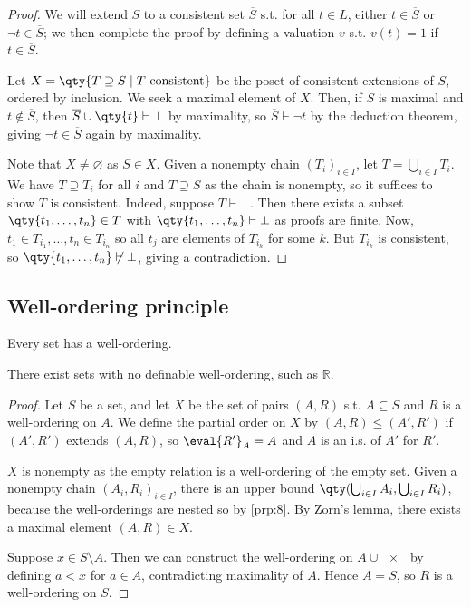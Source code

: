 \begin{proof}
    We will extend $S$ to a consistent set $\overline S$ s.t. for all $t \in L$, either $t \in \overline S$ or $\neg t \in \overline S$; we then complete the proof by defining a valuation $v$ s.t. $v(t) = 1$ if $t \in \overline S$.

    Let $X = \qty{T \supseteq S \mid T \text{ consistent}}$ be the poset of consistent extensions of $S$, ordered by inclusion.
    We seek a maximal element of $X$.
    Then, if $\overline S$ is maximal and $t \not\in \overline S$, then $\overline S \cup \qty{t} \vdash \bot$ by maximality, so $\overline S \vdash \neg t$ by the deduction theorem, giving $\neg t \in \overline S$ again by maximality.

    Note that $X \neq \varnothing$ as $S \in X$.
    Given a nonempty chain $(T_i)_{i \in I}$, let $T = \bigcup_{i \in I} T_i$.
    We have $T \supseteq T_i$ for all $i$ and $T \supseteq S$ as the chain is nonempty, so it suffices to show $T$ is consistent.
    Indeed, suppose $T \vdash \bot$.
    Then there exists a subset $\qty{t_1, \dots, t_n} \in T$ with $\qty{t_1, \dots, t_n} \vdash \bot$ as proofs are finite.
    Now, $t_1 \in T_{i_1}, \dots, t_n \in T_{i_n}$ so all $t_j$ are elements of $T_{i_k}$ for some $k$.
    But $T_{i_k}$ is consistent, so $\qty{t_1, \dots, t_n} \not\vdash \bot$, giving a contradiction.
\end{proof}

\subsection{Well-ordering principle}
\begin{theorem}
    Every set has a well-ordering.
\end{theorem}
There exist sets with no definable well-ordering, such as $\mathbb R$.
\begin{proof}
    Let $S$ be a set, and let $X$ be the set of pairs $(A, R)$ s.t. $A \subseteq S$ and $R$ is a well-ordering on $A$.
    We define the partial order on $X$ by $(A, R) \leq (A', R')$ if $(A', R')$ extends $(A, R)$, so $\eval{R'}_A = A$ and $A$ is an i.s. of $A'$ for $R'$.

    $X$ is nonempty as the empty relation is a well-ordering of the empty set.
    Given a nonempty chain $(A_i, R_i)_{i \in I}$, there is an upper bound $\qty(\bigcup_{i \in I} A_i, \bigcup_{i \in I} R_i)$, because the well-orderings are nested so by \cref{prp:8}.
    By Zorn's lemma, there exists a maximal element $(A, R) \in X$.

    Suppose $x \in S \setminus A$.
    Then we can construct the well-ordering on $A \cup \qty{x}$ by defining $a < x$ for $a \in A$, contradicting maximality of $A$.
    Hence $A = S$, so $R$ is a well-ordering on $S$.
\end{proof}

